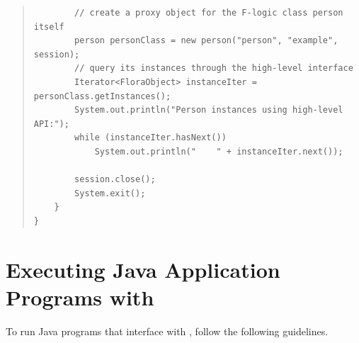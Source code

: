 \begin{quote}
\begin{verbatim}
        // create a proxy object for the F-logic class person itself
        person personClass = new person("person", "example", session);
        // query its instances through the high-level interface
        Iterator<FloraObject> instanceIter = personClass.getInstances();
        System.out.println("Person instances using high-level API:");
        while (instanceIter.hasNext())
            System.out.println("    " + instanceIter.next());
        
        session.close();
        System.exit();
    }
}
\end{verbatim}
\end{quote}

\section{Executing Java Application Programs with \FLSYSTEM}
\label{sec-executing-apps}

To run Java programs that interface with \FLSYSTEM, follow the
following guidelines.

